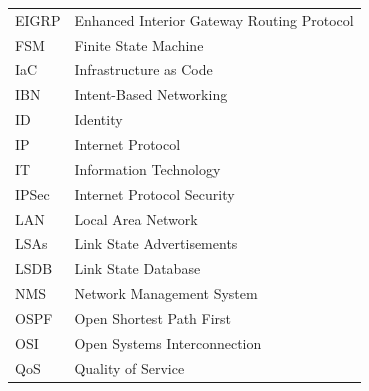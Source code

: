 \begin{tabular}{ l l }
\hspace{1cm}  EIGRP & \hspace{3cm} Enhanced Interior Gateway Routing Protocol\\
\hspace{1cm} FSM  & \hspace{3cm} Finite State Machine       \\
\hspace{1cm} IaC  & \hspace{3cm} Infrastructure as Code   \\
\hspace{1cm} IBN  & \hspace{3cm} Intent-Based Networking   \\
\hspace{1cm} ID  & \hspace{3cm} Identity   \\
\hspace{1cm} IP & \hspace{3cm} Internet Protocol         \\
\hspace{1cm} IT & \hspace{3cm} Information Technology         \\
\hspace{1cm} IPSec &\hspace{3cm} Internet Protocol Security         \\
\hspace{1cm} LAN  & \hspace{3cm} Local Area Network                  \\
\hspace{1cm} LSAs  & \hspace{3cm}  Link State Advertisements      \\
\hspace{1cm} LSDB  & \hspace{3cm} Link State Database     \\
\hspace{1cm} NMS  & \hspace{3cm} Network Management System      \\
\hspace{1cm} OSPF & \hspace{3cm} Open Shortest Path First          \\
\hspace{1cm} OSI & \hspace{3cm} Open Systems Interconnection       \\
\hspace{1cm} QoS & \hspace{3cm} Quality of Service       \\

\end{tabular}
